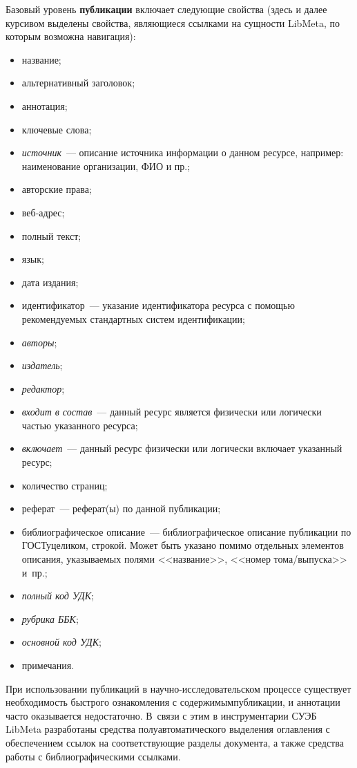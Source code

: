 \begin{multicols}{2}
  Базовый уровень \textbf{публикации} включает сле\-ду\-ющие свойства (здесь и далее 
курсивом выделены свойства, являющиеся ссылками на сущности LibMeta, по которым 
возможна навигация):
  \begin{itemize}
\item название;
\item альтернативный заголовок;
\item аннотация;
\item ключевые слова;
\item \textit{источник}~--- описание источника информации о данном ресурсе, например: наименование 
организации, ФИО и пр.;
\item авторские права;
\item веб-адрес;
\item полный текст;
\item язык;
\item дата издания;
\item идентификатор~--- указание идентификатора ресурса с помощью рекомендуемых стандартных 
систем идентификации;
\item \textit{авторы};
\item \textit{издатель};
\item \textit{редактор};
\item \textit{входит в состав}~--- данный ресурс является физически или логически частью указанного 
ресурса;
\item \textit{включает}~--- данный ресурс физически или логически включает указанный ресурс;
\item количество страниц;
\item реферат~--- реферат(ы) по данной публикации;
\item библиографическое описание~--- библио\-гра\-фическое описание публикации по ГОСТу\linebreak целиком, 
строкой. Может быть указано помимо отдель\-ных элементов описания, указыва\-емых полями 
<<название>>, <<номер тома/выпуска>> и~пр.;
\item \textit{полный код УДК};
\item \textit{рубрика ББК};
\item \textit{основной код УДК};
\item примечания.
\end{itemize}

  При использовании публикаций в на\-уч\-но-ис\-сле\-до\-ва\-тель\-ском процессе 
существует необходимость быстрого ознакомления с содержимым\linebreak публикации, и аннотации 
часто оказывается недостаточно. В~связи с этим в инструментарии СУЭБ LibMeta 
разработаны средства полуавтоматического выделения оглавления с обеспечением ссылок на 
соответствующие разделы документа, а также средства работы с библиографическими 
ссылками. 
  

\end{multicols}
